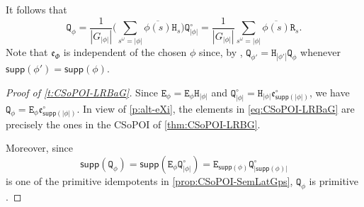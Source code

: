 \documentclass[11pt, oneside, reqno]{amsart}
\theoremstyle{definition}
\numberwithin{equation}{section}
\def \ol{\overline}
\def \ee{{\mathfrak{e}}}
\def \supp{\mathsf{supp}}
\newcommand{\B}[1]{\mathtt{#1}} 			%
\newcommand{\abs}[1]{|{#1}|} 				%
\begin{document}
It follows that
\begin{equation}\label{eq:LRBaG-R-to-Q}
    \B{Q}_\phi =
    \dfrac{1}{|G_{\abs{\phi}}|} \Big( \sum_{s^\omega = \abs{\phi}} \ol{\phi(s)} \B{H}_s  \Big) \B{Q}^\circ_{\abs{\phi}} =
    \dfrac{1}{|G_{\abs{\phi}}|} \sum_{s^\omega = \abs{\phi}} \ol{\phi(s)} \B{R}_s.
\end{equation}
Note that $\ee_\Phi$ is independent of the chosen $\phi$ since, by ,
$\B{Q}_{\phi'} = \B{H}_{\abs{\phi'}} \B{Q}_{\phi}$
whenever $\supp(\phi') = \supp(\phi)$.

\begin{proof}[Proof of \cref{t:CSoPOI-LRBaG}]
    Since $\B{E}_\phi = \B{E}_\phi \B{H}_{\abs{\phi}}$ and $\B{Q}^\circ_{\abs{\phi}} = \B{H}_{\abs{\phi}} \ee^\circ_{\supp(\abs{\phi})}$, we have $\B{Q}_\phi = \B{E}_\phi \ee^\circ_{\supp(\abs{\phi})}$.
    In view of \cref{p:alt-eXi}, the elements in \cref{eq:CSoPOI-LRBaG} are precisely the ones in the CSoPOI of \cref{thm:CSoPOI-LRBG}.

    Moreover, since
    \[
        \supp(\B{Q}_\phi) = \supp(\B{E}_\phi \B{Q}^\circ_{\abs{\phi}}) = \B{E}_{\supp(\phi)} \B{Q}^\circ_{\abs{\supp(\phi)}}
    \]
    is one of the primitive idempotents in \cref{prop:CSoPOI-SemLatGps}, $\B{Q}_\phi$ is primitive \cite[Lemma~D.28]{am17}.
\end{proof}
\end{document}
